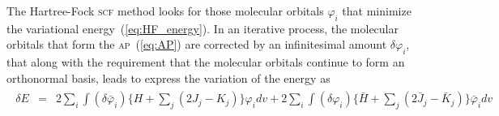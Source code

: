 The Hartree-Fock \textsc{scf} method looks for those molecular
orbitals $\varphi_{i}$ that minimize the variational
energy~(\ref{eq:HF_energy}). In an iterative process, the molecular
orbitals that form the \textsc{ap}~(\ref{eq:AP}) are corrected by an
infinitesimal amount $\delta\varphi_{i}$, that along with the
requirement that the molecular orbitals continue to form an
orthonormal basis, leads to express the variation of the energy
as~\cite{Roothaan_HF}
%
\begin{eqnarray}
  \begin{split}
    \delta E & = & 2 \sum\limits_{i} \int (\delta\bar\varphi_{i})
    \{ H + \sum\limits_{j} (2J_{j} - K_{j}) \} \varphi_{i} dv +
    2 \sum\limits_{i} \int (\delta\varphi_{i})
    \{ \bar H + \sum\limits_{j} (2\bar J_{j} - \bar K_{j}) \}
    \bar\varphi_{i} dv
  \end{split}
  \label{eq:delta_Ehf}
\end{eqnarray}
%

